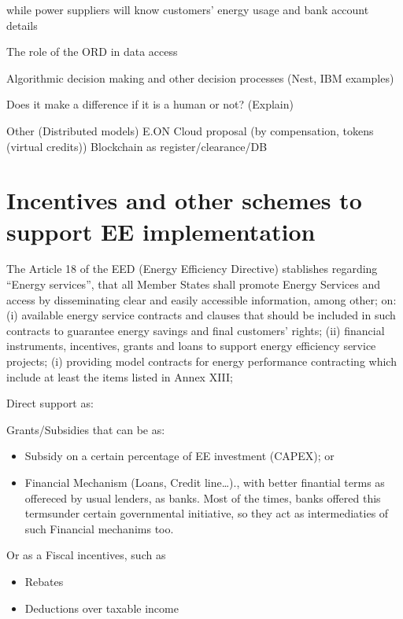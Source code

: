 \documentclass[]{book}
\providecommand{\tightlist}{%
  \setlength{\itemsep}{0pt}\setlength{\parskip}{0pt}}
\theoremstyle{definition}
\theoremstyle{definition}
\theoremstyle{definition}
\theoremstyle{remark}
\begin{document}
while power suppliers will know customers' energy usage and bank account
details

The role of the ORD in data access

Algorithmic decision making and other decision processes (Nest, IBM
examples)

Does it make a difference if it is a human or not? (Explain)

Other (Distributed models) E.ON Cloud proposal (by compensation, tokens
(virtual credits)) Blockchain as register/clearance/DB

\section{Incentives and other schemes to support EE
implementation}\label{incentives-and-other-schemes-to-support-ee-implementation}

The Article 18 of the EED (Energy Efficiency Directive) stablishes
regarding ``Energy services'', that all Member States shall promote
Energy Services and access by disseminating clear and easily accessible
information, among other; on: (i) available energy service contracts and
clauses that should be included in such contracts to guarantee energy
savings and final customers' rights; (ii) financial instruments,
incentives, grants and loans to support energy efficiency service
projects; (i) providing model contracts for energy performance
contracting which include at least the items listed in Annex XIII;

Direct support as:

Grants/Subsidies that can be as:

\begin{itemize}
\tightlist
\item
  Subsidy on a certain percentage of EE investment (CAPEX); or
\item
  Financial Mechanism (Loans, Credit line\ldots{})., with better
  finantial terms as offereced by usual lenders, as banks. Most of the
  times, banks offered this termsunder certain governmental initiative,
  so they act as intermediaties of such Financial mechanims too.
\end{itemize}

Or as a Fiscal incentives, such as

\begin{itemize}
\tightlist
\item
  Rebates
\item
  Deductions over taxable income
\end{itemize}
\end{document}
